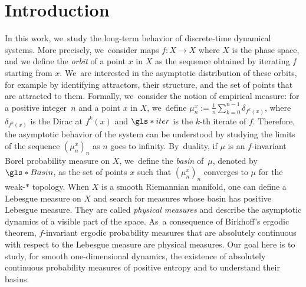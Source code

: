 \section{Introduction}
\label{sec:intro}

In this work, we~study the long-term behavior of discrete-time dynamical systems.
More precisely, we~consider maps $f : X \to X$ where $X$ is the phase space,
and we define the \textit{orbit} of a point $x$ in $X$ as the sequence obtained by iterating $f$ starting from $x$. We~are interested in the asymptotic distribution of these orbits, for \hbox{example} by identifying attractors, their structure, and the set of points that are attracted to them.
Formally, we~consider the notion of empirical measure: for a positive integer~$n$ and a point $x$ in $X$, we~define $\mu_n^x := \frac{1}{n} \sum_{k=0}^{n-1} \delta_{f^k(x)}$, where $\delta_{f^k(x)}$ is the Dirac at $f^k(x)$ and $\gls*{iter}$ is the $k$-th iterate of $f$.
Therefore, the asymptotic behavior of the system can be understood by studying the limits of the sequence $(\mu_n^x)_{n}$ as $n$ goes to infinity. By~duality, if $\mu$ is an $f$\nobreakdash-invariant Borel probability measure on $X$, we~define the \textit{basin} of~$\mu$, denoted by $\gls*{Basin}$, as the set of points $x$ such that $\left (\mu_n^x \right)_n$ converges to $\mu$ for the weak\nobreakdash-$*$ topology.
When $X$ is a smooth Riemannian manifold, one can define a Lebesgue measure on $X$ and search for measures whose basin has positive Lebesgue measure. They are called \textit{physical measures} and describe the asymptotic dynamics of a visible part of the space. As~a consequence of Birkhoff's ergodic theorem, $f$\nobreakdash-invariant ergodic probability measures that are absolutely continuous with respect to the Lebesgue measure are physical measures.
Our goal here is to study, for smooth one-dimensional dynamics, the existence of absolutely continuous probability measures of positive entropy and to understand their basins.

